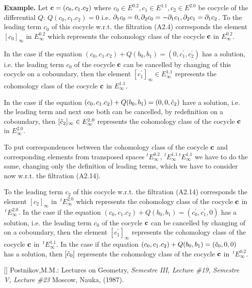  {\bf Example.} Let ${\bf c}=(c_0,c_1.c_2)$ where
 $c_0\in E^{0.2}, c_1\in E^{1.1}, c_2\in E^{2.0}$ be cocycle
 of the differential $Q$:
$Q(c_0,c_1.c_2)=0$ i.e. $\partial_1 c_0=0,\partial_2 c_0=-\partial_1 c_1,
                        \partial_2 c_1=\partial_1 c_2$.
 To the leading term $c_0$ of this cocycle w.r.t. the
filtration (A2.4) corresponds the element
 $[c_0]_\infty$ in $E^{0.2}_\infty$
which  represents the cohomology class
 of the cocycle ${\bf c}$ in
   $E^{0.2}_\infty$.

In the case if the equation
$(c_0,c_1.c_2)+Q(b_0,b_1)=(0,c_1^\prime,c_2^\prime)$
 has a solution, i.e. the leading term $c_0$
 of the cocycle ${\bf c}$  can be cancelled
  by changing of this cocycle on a coboundary, then
the element   $[c_1^\prime]_\infty\in E^{1.1}_\infty$
 represents the cohomology class of the cocycle ${\bf c}$ in
   $E^{1.1}_\infty$.

 In the case if the equation
$(c_0,c_1.c_2)+Q(b_0,b_1)=(0,0,\tilde c_2)$ have a solution, i.e. the
leading term and next one both can be cancelled, by redefinition on
a coboundary, then
  $[{\tilde c_2}]_\infty\in E^{2.0}_\infty$
 represents the cohomology class of the cocycle ${\bf c}$ in
   $E^{2.0}_\infty$.

  To put correspondences between
  the cohomology class of the cocycle ${\bf c}$
 and corresponding elements from
 transposed spaces
$^tE^{0.2}_\infty,\,^t E^{1.1}_\infty\,^tE^{1.1}_\infty$ we have to
do the same, changing only the definition of leading terms, which we
have to consider now w.r.t. the filtration (A2.14).

 To the leading term $c_2$ of this cocycle w.r.t. the
filtration (A2.14) corresponds the element
 $[c_2]_\infty$ in $\,^tE^{2.0}_\infty$
which  represents the cohomology class
 of the cocycle ${\bf c}$ in
   $\,^tE^{2.0}_\infty$.
In the case if the equation
$(c_0,c_1.c_2)+Q(b_0,b_1)=(c_0^\prime,c_1^\prime,0)$
 has a solution, i.e. the leading term $c_0$
 of the cocycle ${\bf c}$  can be cancelled
  by changing of on a coboundary, then
the element $[c_1^\prime]_\infty$
 represents the cohomology class of the cocycle ${\bf c}$ in
   $\,^tE^{1.1}_\infty$.
 In the case if the equation
 $(c_0,c_1.c_2)+Q(b_0,b_1)=(\tilde c_0,0,0)$
 has a solution, then $[{\tilde c_0}]$
 represents the cohomology class of the cocycle ${\bf c}$ in
   $\,^tE^{0.2}_\infty$.



 [\Postn]  Postnikov,M.M.: Lectures on Geometry,
  {\it Semestre III, Lecture \#19,
 Semestre V, Lecture \#23}
  Moscow, Nauka, (1987).


\bye
